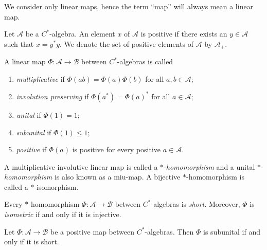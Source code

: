We consider only linear maps, hence the term ``map'' will always mean a linear map.


\begin{definition}
  Let $ \mathscr{A}$ be a \( C^* \)-algebra. An element $x$ of $ \mathscr{A}$ is  positive if there exists an $y \in  \mathscr{A}$ such that $x = y^* y$.
  We denote the set of positive elements of $ \mathscr{A}$ by $ \mathscr{A}_+$.
\end{definition}


\begin{definition}
 A linear map $\Phi: \mathscr{A} \to \mathscr{B}$ between $C^*$-algebras is called
\begin{enumerate}
    \item \emph{multiplicative} if $\Phi(ab) = \Phi(a)\Phi(b)$ for all $a, b \in \mathscr{A} $;
    \item \emph{involution preserving} if $\Phi(a^*) = \Phi(a)^*$ for all $a \in \mathscr{A} $;
    \item \emph{unital} if $\Phi(1) = 1$;
    \item \emph{subunital} if $\Phi(1) \leq 1$;
    \item \emph{positive} if $\Phi(a)$ is positive for every positive $a \in \mathscr{A} $.
\end{enumerate}
A multiplicative involutive linear map is called a \(*\)-\emph{homomorphism} and a unital \(*\)-\emph{homomorphism} is also known as a \acrshort{miu}-map. A bijective \(*\)-homomorphism is called a \(*\)-isomorphism.
\end{definition}

\begin{proposition} \cite[Theorem 1.5.7]{pedersenCalgebrasTheirAutomorphism1979} \label{prop:HomShortIsoIso}
  Every \(*\)-homomorphism \( \Phi: \mathscr{A} \to \mathscr{B} \) between \( C^* \)-algebras is \emph{short}. Moreover, \( \Phi \) is \emph{isometric} if and only if it is injective.
\end{proposition}

\begin{proposition} \cite[Proposition 2.4]{choSemanticsQuantumProgramming2016} \label{prop:subunital_short}
Let \( \Phi: \mathscr{A} \to \mathscr{B} \) be a positive map between \( C^* \)-algebras. Then \( \Phi \) is subunital if and only if it is short.
\end{proposition}


